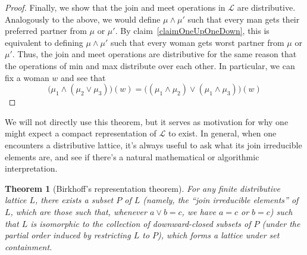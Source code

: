\documentclass[12pt]{article}
\renewcommand{\L}{\mathcal{L}}
\newtheorem{theorem}[definition]{Theorem}
\begin{document}
\begin{proof}
    Finally, we show that the join and meet operations in $\L$ are distributive.
    Analogously to the above, we would define $\mu\wedge\mu'$ such that every
    man gets their preferred partner from $\mu$ or $\mu'$.
    By claim~\ref{claimOneUpOneDown}, this is equivalent to defining
    $\mu\wedge\mu'$ such that every woman
    gets worst partner from $\mu$ or $\mu'$.
    Thus, the join and meet operations are distributive for the same reason that
    the operations of min and max distribute over each other.
    In particular, we can fix a woman $w$ and see that
    \[ \big(\mu_1 \wedge (\mu_2 \vee \mu_3) \big)(w)
    = \big( (\mu_1 \wedge \mu_2) \vee (\mu_1 \wedge \mu_3) \big)(w) \]
  \end{proof}

  We will not directly use this theorem, but it serves as motivation for why one
  might expect a compact representation of $\L$ to exist.
  In general, when one encounters a distributive lattice, it's always useful to
  ask what its join irreducible elements are, and see if there's a natural
  mathematical or algorithmic interpretation.
  \begin{theorem}[Birkhoff's representation theorem]
    For any finite distributive lattice $L$, there exists a subset $P$ of $L$
    (namely, the ``join irreducible elements'' of $L$, which are those such
    that, whenever $a\vee b = c$, we have $a=c$ or $b=c$) such that
    $L$ is isomorphic to the collection of downward-closed subsets of $P$
    (under the partial order induced by restricting $L$ to $P$), which
    forms a lattice under set containment.
  \end{theorem}
\end{document}
